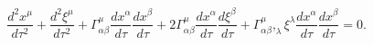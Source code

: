 \begin{equation}
\frac{d^{2}x^{\mu }}{d\tau ^{2}}+\frac{d^{2}\xi ^{\mu }}{d\tau ^{2}}+\Gamma
_{\alpha \beta }^{\mu }\frac{dx^{\alpha }}{d\tau }\frac{dx^{\beta }}{d\tau }%
+2\Gamma _{\alpha \beta }^{\mu }\frac{dx^{\alpha }}{d\tau }\frac{d\xi
^{\beta }}{d\tau }+\Gamma _{\alpha \beta }^{\mu },_{\lambda }\xi ^{\lambda }%
\frac{dx^{\alpha }}{d\tau }\frac{dx^{\beta }}{d\tau }=0.  \label{6}
\end{equation}

